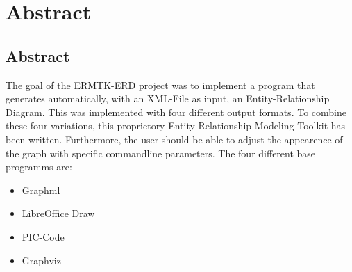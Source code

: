 \part{Abstract}

\chapter{Abstract}
\label{cha:Abstract }

\noindent
The goal of the ERMTK-ERD project was to implement a program that generates automatically, with an XML-File as input, an Entity-Relationship Diagram.
This was implemented with four different output formats. To combine these four variations, this proprietory Entity-Relationship-Modeling-Toolkit has been written. Furthermore, the user should be able to adjust the appearence of the graph with specific commandline parameters. 
The four different base programms are:
\begin{itemize}
	\item Graphml
	\item LibreOffice Draw
	\item PIC-Code
	\item Graphviz
\end{itemize}
